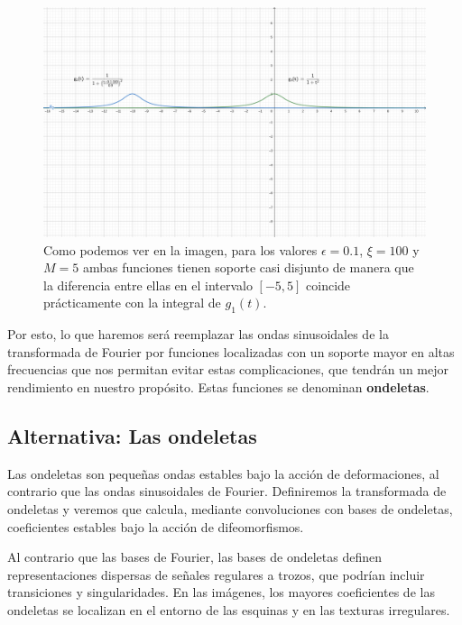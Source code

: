 \begin{observacion}
  \begin{figure}[!h]
    \centering
    \includegraphics[width=1.0\textwidth]{img/geogebra-export_contraejemplo_Fourier.png}
    \caption{Como podemos ver en la imagen, para los valores $\epsilon=0.1$, $\xi=100$ y $M=5$ ambas funciones tienen soporte casi disjunto de manera que la diferencia entre ellas en el intervalo $[-5,5]$ coincide prácticamente con la integral de $g_1(t)$.}
    \label{fig:Grafica_funciones}
  \end{figure}

\end{observacion}
 
\medskip

\noindent Por esto, lo que haremos será reemplazar las ondas sinusoidales de la transformada de Fourier por funciones localizadas con un soporte mayor en altas frecuencias que nos permitan evitar estas complicaciones, que tendrán un mejor rendimiento en nuestro propósito. Estas funciones se denominan \textbf{ondeletas}. 

\medskip

\subsection{Alternativa: Las ondeletas}

\noindent Las ondeletas \cite{MallatWavelets} son pequeñas ondas estables bajo la acción de deformaciones, al contrario que las ondas sinusoidales de Fourier. Definiremos la transformada de ondeletas y veremos que calcula, mediante convoluciones con bases de ondeletas, coeficientes estables bajo la acción de difeomorfismos.

\medskip

\noindent Al contrario que las bases de Fourier, las bases de ondeletas definen  representaciones dispersas de señales regulares a trozos, que podrían incluir transiciones y singularidades. En las imágenes, los mayores coeficientes de las ondeletas se localizan en el entorno de las esquinas y en las texturas irregulares.

